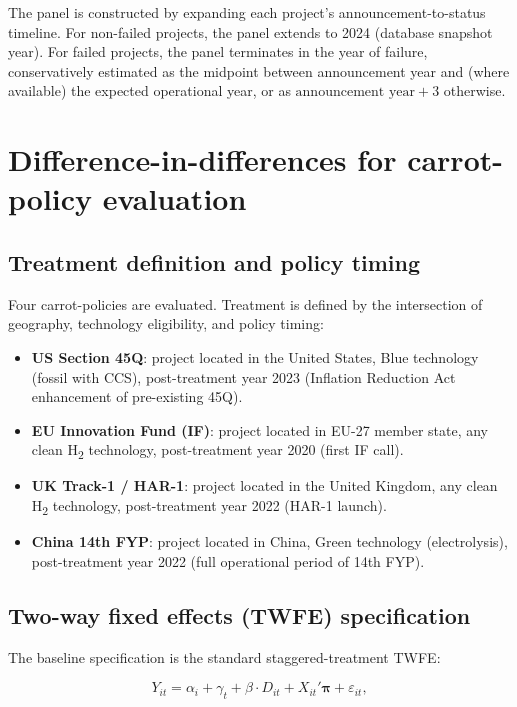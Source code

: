 The panel is constructed by expanding each project's announcement-to-status timeline. For non-failed projects, the panel extends to 2024 (database snapshot year). For failed projects, the panel terminates in the year of failure, conservatively estimated as the midpoint between announcement year and (where available) the expected operational year, or as $\text{announcement year} + 3$ otherwise.

\section{Difference-in-differences for carrot-policy evaluation}
\label{sec:methods_did}

\subsection{Treatment definition and policy timing}

Four carrot-policies are evaluated. Treatment is defined by the intersection of geography, technology eligibility, and policy timing:

\begin{itemize}[leftmargin=2em]
\item \textbf{US Section 45Q}: project located in the United States, Blue technology (fossil with CCS), post-treatment year 2023 (Inflation Reduction Act enhancement of pre-existing 45Q).
\item \textbf{EU Innovation Fund (IF)}: project located in EU-27 member state, any clean H\textsubscript{2} technology, post-treatment year 2020 (first IF call).
\item \textbf{UK Track-1 / HAR-1}: project located in the United Kingdom, any clean H\textsubscript{2} technology, post-treatment year 2022 (HAR-1 launch).
\item \textbf{China 14th FYP}: project located in China, Green technology (electrolysis), post-treatment year 2022 (full operational period of 14th FYP).
\end{itemize}

\subsection{Two-way fixed effects (TWFE) specification}

The baseline specification is the standard staggered-treatment TWFE:

\begin{equation}
Y_{it} = \alpha_i + \gamma_t + \beta \cdot D_{it} + X_{it}' \boldsymbol{\pi} + \varepsilon_{it},
\label{eq:methods_twfe}
\end{equation}

